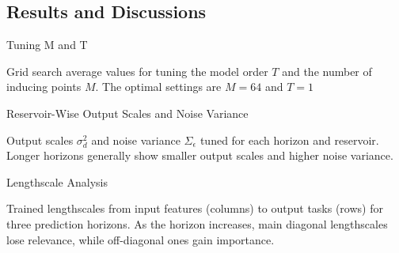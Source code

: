 \subsection{Results and Discussions}

\begin{frame}{Tuning M and T}
 	\begin{figure}[htbp]
	 	\setlength{} 
	 	\setlength{}
 		\hspace{-1em}
	\end{figure}
	Grid search average values for tuning the model order $T$ and the number of inducing points $M$. The optimal settings are $M=64$ and $T=1$
\end{frame}

\begin{frame}{Reservoir-Wise Output Scales and Noise Variance}
	
	\begin{figure}[htbp]
	 	\setlength{} 
		\setlength{}
		\hspace{-1em}
	\end{figure}
	Output scales $\sigma^2_d$ and noise variance $\Sigma_\epsilon$ tuned for each horizon and reservoir. Longer horizons generally show smaller output scales and higher noise variance.
\end{frame}


\begin{frame}{Lengthscale Analysis}
	\begin{figure}[htbp]
		\centering
		\tiny
		\setlength{} 
		\setlength{}
		\subfloat[$H=1.$]{}\hspace{-1.3em}
		\subfloat[$H=14.$]{}\hspace{-1.3em}
		\subfloat[$H=30.$]{}
	\end{figure}
	Trained lengthscales from input features (columns) to output tasks (rows) for three prediction horizons. As the horizon increases, main diagonal lengthscales lose relevance, while off-diagonal ones gain importance.
\end{frame}

